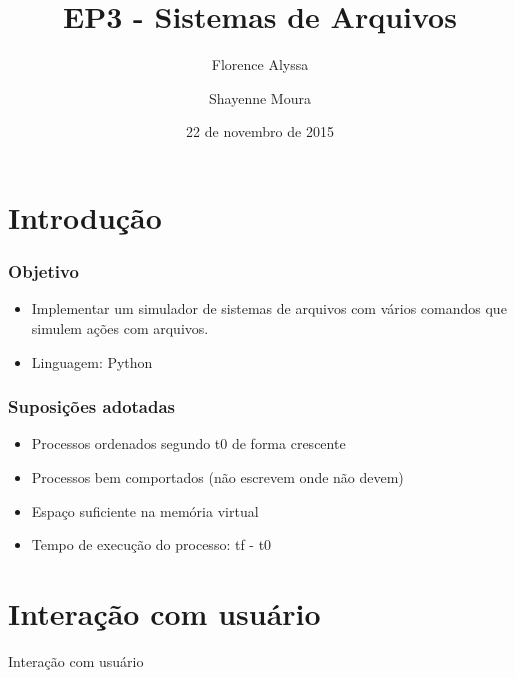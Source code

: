\documentclass{beamer}
\title{EP3 - Sistemas de Arquivos} %
\author{Florence Alyssa \and Shayenne Moura} %
\institute[USP] %
{
Sistemas Operacionais
 \\ Bacharelado em Ciência da Computação%
\medskip
\textit{} %
}
\date{22 de novembro de 2015} %
\begin{document}
\begin{frame}
\titlepage %
\end{frame}


\section{Introdução} 
\begin{frame}
\frametitle{Objetivo}
\begin{itemize}
\item Implementar um simulador de sistemas de arquivos com vários comandos que simulem ações com arquivos.
\newline

\item Linguagem: Python
\end{itemize}

\end{frame}

\begin{frame}
\frametitle{Suposições adotadas}
\begin{itemize}
\item Processos ordenados segundo t0 de forma crescente
\item Processos bem comportados (não escrevem onde não devem)
\item Espaço suficiente na memória virtual
\item Tempo de execução do processo: tf - t0
\end{itemize}
\end{frame}


\section{Interação com usuário}
\begin{frame}
\begin{LARGE}
\begin{center}
Interação com usuário
\end{center}
\end{LARGE}
\end{frame}
\end{document}
